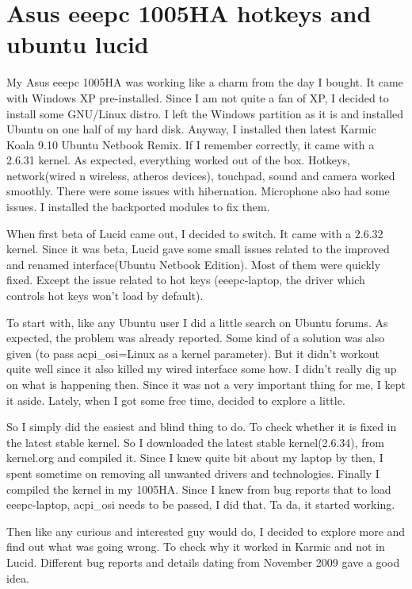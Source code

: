 \section*{Asus eeepc 1005HA hotkeys and ubuntu lucid}
\vskip 2pt

My Asus eeepc 1005HA was working like a charm from the day I bought. 
It came with Windows XP pre-installed. Since I am not quite a fan of XP, I 
decided to install some GNU/Linux distro. I left the Windows partition as 
it is and installed Ubuntu on one half of my hard disk. Anyway, I installed 
then latest Karmic Koala 9.10 Ubuntu Netbook Remix. If I remember correctly, 
it came with a 2.6.31 kernel. As expected, everything worked out of the box.
 Hotkeys, network(wired n wireless, atheros devices), touchpad, sound and camera 
worked smoothly. There were some issues with hibernation. Microphone also had some 
issues. I installed the backported modules to fix them.

When first beta of Lucid came out, I decided to switch. It came with a 2.6.32 kernel. 
Since it was beta, Lucid gave some small issues related to the improved and renamed 
interface(Ubuntu Netbook Edition). Most of them were quickly fixed. Except the issue 
related to hot keys (eeepc-laptop, the driver which controls hot keys won't load by default).

To start with, like any Ubuntu user I did a little search on Ubuntu forums. As expected, 
the problem was already reported. Some kind of a solution was also given 
(to pass acpi\_osi=Linux as a kernel parameter). But it didn't workout quite well since 
it also killed my wired interface some how. I didn’t really dig up on what is happening 
then. Since it was not a very important thing for me, I kept it aside. Lately, when I 
got some free time, decided to explore a little.

So I simply did the easiest and blind thing to do. To check whether it is fixed in the 
latest stable kernel. So I downloaded the latest stable kernel(2.6.34), from kernel.org 
and compiled it. Since I knew quite bit about my laptop by then, I spent sometime on 
removing all unwanted drivers and technologies. Finally I compiled the kernel in my 1005HA. 
Since I knew from bug reports that to load eeepc-laptop, acpi\_osi needs to be passed, 
I did that. Ta da,  it started working.

Then like any curious and interested guy would do, I decided to explore more and find out 
what was going wrong. To check why it worked in Karmic and not in Lucid. 
Different bug reports and details dating from November 2009 gave a good idea.

